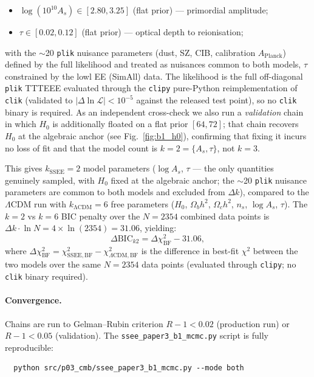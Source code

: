 \documentclass[12pt,a4paper]{article}
\begin{document}
\begin{itemize}[noitemsep]
    \item $\log(10^{10}A_s) \in [2.80, 3.25]$ (flat prior) — primordial amplitude;
    \item $\tau \in [0.02, 0.12]$ (flat prior) — optical depth to reionisation;
\end{itemize}
with the $\sim$20 \texttt{plik} nuisance parameters (dust, SZ, CIB, calibration $A_\mathrm{Planck}$) defined by the full likelihood and treated as nuisances common to both models, $\tau$ constrained by the lowl EE (SimAll) data. The likelihood is the full off-diagonal \texttt{plik} TTTEEE evaluated through the \texttt{clipy} pure-Python reimplementation of \texttt{clik} (validated to $|\Delta\ln\mathcal{L}|<10^{-5}$ against the released test point), so no \texttt{clik} binary is required. As an independent cross-check we also run a \emph{validation} chain in which $H_0$ is additionally floated on a flat prior $[64,72]$; that chain recovers $H_0$ at the algebraic anchor (see Fig.~\ref{fig:b1_h0}), confirming that fixing it incurs no loss of fit and that the model count is $k=2=\{A_s,\tau\}$, not $k=3$.

This gives $k_\mathrm{SSEE} = 2$ model parameters ($\log A_s$, $\tau$ --- the only quantities genuinely sampled, with $H_0$ fixed at the algebraic anchor; the $\sim$20 \texttt{plik} nuisance parameters are common to both models and excluded from $\Delta k$), compared to the $\Lambda$CDM run with $k_\mathrm{\Lambda CDM} = 6$ free parameters ($H_0$, $\Omega_b h^2$, $\Omega_c h^2$, $n_s$, $\log A_s$, $\tau$). The $k=2$ vs $k=6$ BIC penalty over the $N=2354$ combined data points is $\Delta k \cdot \ln N = 4 \times \ln(2354) = 31.06$, yielding:
\begin{equation}
    \label{eq:bic_b1}
    \Delta\mathrm{BIC}_{k2} = \Delta\chi^2_\mathrm{BF} - 31.06,
\end{equation}
where $\Delta\chi^2_\mathrm{BF} = \chi^2_{\mathrm{SSEE,BF}} - \chi^2_{\Lambda\mathrm{CDM,BF}}$ is the difference in best-fit $\chi^2$ between the two models over the same $N=2354$ data points (evaluated through \texttt{clipy}; no \texttt{clik} binary required).

\paragraph{Convergence.}
Chains are run to Gelman--Rubin criterion $R{-}1 < 0.02$ \citep{GelmanRubin1992} (production run) or $R{-}1 < 0.05$ (validation). The \texttt{ssee\_paper3\_b1\_mcmc.py} script is fully reproducible:
\begin{verbatim}
  python src/p03_cmb/ssee_paper3_b1_mcmc.py --mode both
\end{verbatim}
\end{document}
